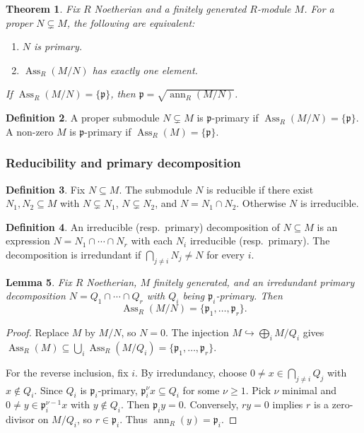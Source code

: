 \documentclass[12pt]{article}
\theoremstyle{plain}
\newtheorem{thm}{Theorem}[subsection] %
\newtheorem{lemma}[thm]{Lemma}
\theoremstyle{definition}
\newtheorem{defn}[thm]{Definition} %
\begin{document}
\begin{thm}\label{thm:primary_single_corr}
Fix $R$ Noetherian and a finitely generated $R$-module $M$. For a proper $N\subsetneq M$, the following are equivalent:
\begin{enumerate}
\item $N$ is primary.
\item $\operatorname{Ass}_R(M/N)$ has exactly one element.
\end{enumerate}
If $\operatorname{Ass}_R(M/N)=\{\mathfrak{p}\}$, then $\mathfrak{p}=\sqrt{\operatorname{ann}_R(M/N)}$.
\end{thm}

\begin{defn}
A proper submodule $N\subsetneq M$ is $\mathfrak{p}$-primary if $\operatorname{Ass}_R(M/N)=\{\mathfrak{p}\}$. A non-zero $M$ is $\mathfrak{p}$-primary if $\operatorname{Ass}_R(M)=\{\mathfrak{p}\}$.
\end{defn}

\subsubsection*{Reducibility and primary decomposition}

\begin{defn}
Fix $N\subseteq M$. The submodule $N$ is reducible if there exist $N_1,N_2\subseteq M$ with $N\subsetneq N_1$, $N\subsetneq N_2$, and $N=N_1\cap N_2$. Otherwise $N$ is irreducible.
\end{defn}

\begin{defn}
An irreducible (resp.\ primary) decomposition of $N\subseteq M$ is an expression $N=N_1\cap\cdots\cap N_r$ with each $N_i$ irreducible (resp.\ primary). The decomposition is irredundant if $\bigcap_{j\ne i}N_j\ne N$ for every $i$.
\end{defn}

\begin{lemma}\label{lem:irred_primary_corr}
Fix $R$ Noetherian, $M$ finitely generated, and an irredundant primary decomposition $N=Q_1\cap\cdots\cap Q_r$ with $Q_i$ being $\mathfrak{p}_i$-primary. Then
\[
\operatorname{Ass}_R(M/N)=\{\mathfrak{p}_1,\ldots,\mathfrak{p}_r\}.
\]
\end{lemma}
\begin{proof}
Replace $M$ by $M/N$, so $N=0$. The injection $M\hookrightarrow\bigoplus_i M/Q_i$ gives $\operatorname{Ass}_R(M)\subseteq\bigcup_i\operatorname{Ass}_R(M/Q_i)=\{\mathfrak{p}_1,\ldots,\mathfrak{p}_r\}$.

For the reverse inclusion, fix $i$. By irredundancy, choose $0\ne x\in\bigcap_{j\ne i}Q_j$ with $x\notin Q_i$. Since $Q_i$ is $\mathfrak{p}_i$-primary, $\mathfrak{p}_i^\nu x\subseteq Q_i$ for some $\nu\ge 1$. Pick $\nu$ minimal and $0\ne y\in\mathfrak{p}_i^{\nu-1}x$ with $y\notin Q_i$. Then $\mathfrak{p}_i y=0$. Conversely, $ry=0$ implies $r$ is a zero-divisor on $M/Q_i$, so $r\in\mathfrak{p}_i$. Thus $\operatorname{ann}_R(y)=\mathfrak{p}_i$.
\end{proof}
\end{document}
